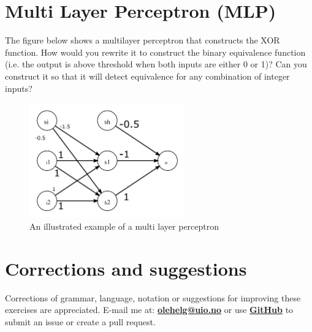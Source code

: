\documentclass{article}           %
\begin{document}
\section{Multi Layer Perceptron (MLP)}
The figure below shows a multilayer perceptron that constructs the XOR function.
How would you rewrite it to construct the binary equivalence function
(i.e. the output is above threshold when both inputs are either 0 or 1)? Can
you construct it so that it will detect equivalence for any combination of integer
inputs?

\begin{figure}[H]
\begin{center}
\includegraphics[width=0.6\textwidth]{fig2.png}
\caption{An illustrated example of a multi layer perceptron}
\label{fig:mlp}
\end{center}
\end{figure}

\section*{Corrections and suggestions}
Corrections of grammar, language, notation or suggestions for improving these exercises are appreciated.
E-mail me at: \href{mailto:olehelg@uio.no}{\textbf{olehelg@uio.no}} or use
\href{https://github.com/olehermanse/INF3490-AI_Machine_Learning}{\textbf{GitHub}}
to submit an issue or create a pull request.
\end{document}
